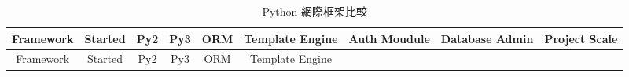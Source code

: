 \documentclass[12pt,,]{report}
\begin{document}
\begin{longtable}[]{@{}ccccccccc@{}}
\caption{Python 網際框架比較 \label{tbl:網際框架}}\tabularnewline
\toprule
\begin{minipage}[b]{0.09\columnwidth}\centering
Framework\strut
\end{minipage} & \begin{minipage}[b]{0.07\columnwidth}\centering
Started\strut
\end{minipage} & \begin{minipage}[b]{0.04\columnwidth}\centering
Py2\strut
\end{minipage} & \begin{minipage}[b]{0.04\columnwidth}\centering
Py3\strut
\end{minipage} & \begin{minipage}[b]{0.04\columnwidth}\centering
ORM\strut
\end{minipage} & \begin{minipage}[b]{0.13\columnwidth}\centering
Template Engine\strut
\end{minipage} & \begin{minipage}[b]{0.11\columnwidth}\centering
Auth Moudule\strut
\end{minipage} & \begin{minipage}[b]{0.12\columnwidth}\centering
Database Admin\strut
\end{minipage} & \begin{minipage}[b]{0.11\columnwidth}\centering
Project Scale\strut
\end{minipage}\tabularnewline
\midrule
\endfirsthead
\toprule
\begin{minipage}[b]{0.09\columnwidth}\centering
Framework\strut
\end{minipage} & \begin{minipage}[b]{0.07\columnwidth}\centering
Started\strut
\end{minipage} & \begin{minipage}[b]{0.04\columnwidth}\centering
Py2\strut
\end{minipage} & \begin{minipage}[b]{0.04\columnwidth}\centering
Py3\strut
\end{minipage} & \begin{minipage}[b]{0.04\columnwidth}\centering
ORM\strut
\end{minipage} & \begin{minipage}[b]{0.13\columnwidth}\centering
Template Engine\strut
\end{minipage} & \begin{minipage}[b]{0.11\columnwidth}\centering

\end{minipage}
\end{longtable}
\end{document}
